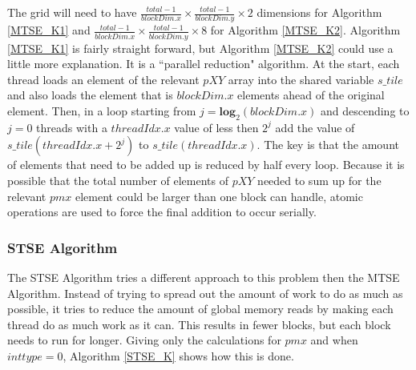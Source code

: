 \documentclass[12pt]{report}
\begin{document}
The grid will need to have $\frac{total - 1}{blockDim.x} \times \frac{total - 1}{blockDim.y} \times 2$ dimensions for Algorithm \ref{MTSE_K1} and $\frac{total - 1}{blockDim.x} \times \frac{total - 1}{blockDim.y} \times 8$ for Algorithm \ref{MTSE_K2}. Algorithm \ref{MTSE_K1} is fairly straight forward, but Algorithm \ref{MTSE_K2} could use a little more explanation. It is a ``parallel reduction" algorithm. At the start, each thread loads an element of the relevant $pXY$ array into the shared variable $s\_tile$ and also loads the element that is $blockDim.x$ elements ahead of the original element. Then, in a loop starting from $j= \textbf{log}_{2}(blockDim.x)$ and descending to $j = 0$ threads with a $threadIdx.x$ value of less then $2^{j}$ add the value of  $s\_tile(threadIdx.x + 2^{j})$ to $s\_tile(threadIdx.x)$. The key is that the amount of elements that need to be added up is reduced by half every loop. Because it is possible that the total number of elements of $pXY$ needed to sum up for the relevant $pmx$ element could be larger than one block can handle, atomic operations are used to force the final addition to occur serially.

\subsubsection{STSE Algorithm}
The STSE Algorithm tries a different approach to this problem then the MTSE Algorithm. Instead of trying to spread out the amount of work to do as much as possible, it tries to reduce the amount of global memory reads by making each thread do as much work as it can. This results in fewer blocks, but each block needs to run for longer. Giving only the calculations for $pmx$ and when $inttype = 0$, Algorithm \ref{STSE_K} shows how this is done.
\end{document}
